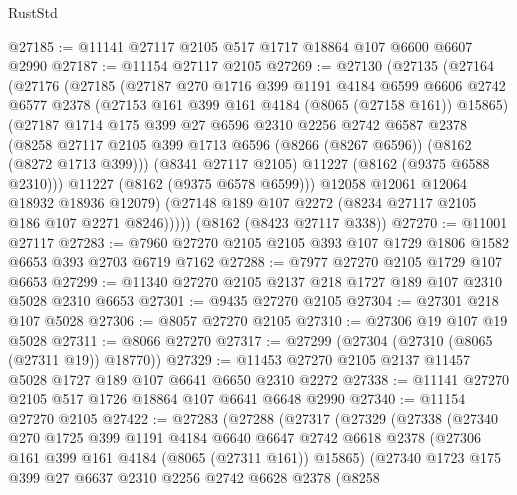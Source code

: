 \begin{lexlean}{RustStd}
\begin{coremodule}
@27185 := @11141 @27117 @2105 @517 @1717 @18864 @107 @6600 @6607 @2990
@27187 := @11154 @27117 @2105
@27269 := @27130
    (@27135
      (@27164
        (@27176
          (@27185
            (@27187
              @270
              @1716
              @399
              @1191
              @4184
              @6599
              @6606
              @2742
              @6577
              @2378
              (@27153 @161 @399 @161 @4184 (@8065 (@27158 @161)) @15865)
              (@27187
                @1714
                @175
                @399
                @27
                @6596
                @2310
                @2256
                @2742
                @6587
                @2378
                (@8258
                  @27117
                  @2105
                  @399
                  @1713
                  @6596
                  (@8266 (@8267 @6596))
                  (@8162 (@8272 @1713 @399)))
                (@8341 @27117 @2105)
                @11227
                (@8162 (@9375 @6588 @2310)))
              @11227
              (@8162 (@9375 @6578 @6599)))
            @12058
            @12061
            @12064
            @18932
            @18936
            @12079)
          (@27148 @189 @107 @2272 (@8234 @27117 @2105 @186 @107 @2271 @8246)))))
    (@8162 (@8423 @27117 @338))
@27270 := @11001 @27117
@27283 := @7960 @27270 @2105 @2105 @393 @107 @1729 @1806 @1582 @6653 @393 @2703 @6719 @7162
@27288 := @7977 @27270 @2105 @1729 @107 @6653
@27299 := @11340 @27270 @2105 @2137 @218 @1727 @189 @107 @2310 @5028 @2310 @6653
@27301 := @9435 @27270 @2105
@27304 := @27301 @218 @107 @5028
@27306 := @8057 @27270 @2105
@27310 := @27306 @19 @107 @19 @5028
@27311 := @8066 @27270
@27317 := @27299 (@27304 (@27310 (@8065 (@27311 @19)) @18770))
@27329 := @11453 @27270 @2105 @2137 @11457 @5028 @1727 @189 @107 @6641 @6650 @2310 @2272
@27338 := @11141 @27270 @2105 @517 @1726 @18864 @107 @6641 @6648 @2990
@27340 := @11154 @27270 @2105
@27422 := @27283
    (@27288
      (@27317
        (@27329
          (@27338
            (@27340
              @270
              @1725
              @399
              @1191
              @4184
              @6640
              @6647
              @2742
              @6618
              @2378
              (@27306 @161 @399 @161 @4184 (@8065 (@27311 @161)) @15865)
              (@27340
                @1723
                @175
                @399
                @27
                @6637
                @2310
                @2256
                @2742
                @6628
                @2378
                (@8258

\end{coremodule}
\end{lexlean}
